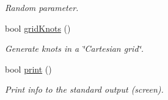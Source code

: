 \begin{CompactItemize}
\begin{CompactList}\small\item\em Random parameter. \item\end{CompactList}\item 
bool \hyperlink{classPARectangleKnots_06a385116f58ff16cbf0fc91211f5e05}{gridKnots} ()
\begin{CompactList}\small\item\em Generate knots in a \char`\"{}Cartesian grid\char`\"{}. \item\end{CompactList}\item 
\hypertarget{classPARectangleKnots_880af2608f805b2e13bab692c7b868ef}{
bool \hyperlink{classPARectangleKnots_880af2608f805b2e13bab692c7b868ef}{print} ()}
\label{classPARectangleKnots_880af2608f805b2e13bab692c7b868ef}

\begin{CompactList}\small\item\em Print info to the standard output (screen). \item\end{CompactList}\end{CompactItemize}
